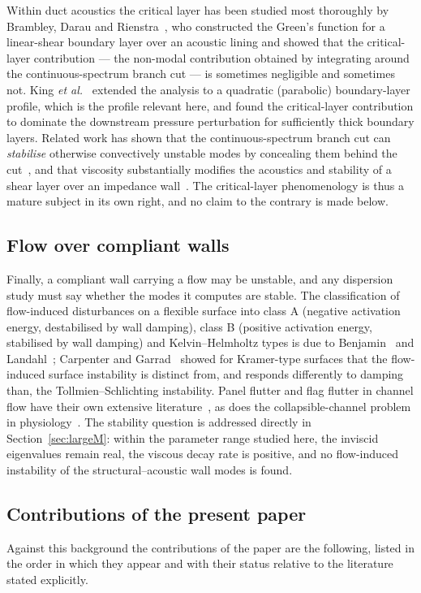 \documentclass[11pt,a4paper]{article}
\theoremstyle{plain}
\theoremstyle{remark}
\begin{document}
Within duct acoustics the critical layer has been studied most thoroughly by Brambley, Darau and
Rienstra~\cite{brambleydarau}, who constructed the Green's function for a linear-shear boundary layer
over an acoustic lining and showed that the critical-layer contribution --- the non-modal contribution
obtained by integrating around the continuous-spectrum branch cut --- is sometimes negligible and
sometimes not. King \emph{et al.}~\cite{king2022} extended the analysis to a quadratic (parabolic)
boundary-layer profile, which is the profile relevant here, and found the critical-layer contribution
to dominate the downstream pressure perturbation for sufficiently thick boundary layers. Related work
has shown that the continuous-spectrum branch cut can \emph{stabilise} otherwise convectively unstable
modes by concealing them behind the cut~\cite{king2022}, and that viscosity substantially modifies
the acoustics and stability of a shear layer over an impedance wall~\cite{khamisbrambleyvisc}. The
critical-layer phenomenology is thus a mature subject in its own right, and no claim to the contrary is
made below.

\subsection{Flow over compliant walls}
Finally, a compliant wall carrying a flow may be unstable, and any dispersion study must say whether
the modes it computes are stable. The classification of flow-induced disturbances on a flexible surface
into class A (negative activation energy, destabilised by wall damping), class B (positive activation
energy, stabilised by wall damping) and Kelvin--Helmholtz types is due to Benjamin~\cite{benjamin} and
Landahl~\cite{landahl}; Carpenter and Garrad~\cite{carpentergarrad} showed for Kramer-type surfaces
that the flow-induced surface instability is distinct from, and responds differently to damping than,
the Tollmien--Schlichting instability. Panel flutter and flag flutter in channel flow have their own
extensive literature~\cite{eloy,alben,paidoussis}, as does the collapsible-channel problem in
physiology~\cite{grotberg,pedley,stewart}. The stability question is addressed directly in
Section~\ref{sec:largeM}: within the parameter range studied here, the inviscid eigenvalues remain
real, the viscous decay rate is positive, and no flow-induced instability of the structural--acoustic
wall modes is found.

\subsection{Contributions of the present paper}\label{sec:contrib}
Against this background the contributions of the paper are the following, listed in the order in which
they appear and with their status relative to the literature stated explicitly.
\end{document}
